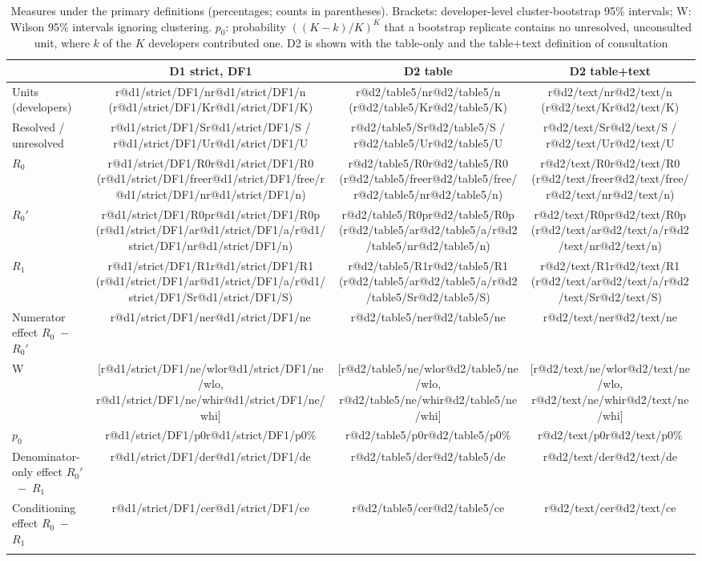 \documentclass[pdflatex,sn-basic]{sn-jnl}
\makeatletter
\newcommand{\R}[1]{\ifcsname r@#1\endcsname\csname r@#1\endcsname\else\errmessage{results.tex: unknown key #1}\fi}
\newcommand{\CI}[1]{[\R{#1/lo}, \R{#1/hi}]}
\newcommand{\WCI}[1]{[\R{#1/wlo}, \R{#1/whi}]}
\newcommand{\Rz}{\ensuremath{R_0}}
\newcommand{\Rzp}{\ensuremath{R_0'}}
\newcommand{\Ro}{\ensuremath{R_1}}
\makeatother
\begin{document}
\begin{table}[t]
\caption{Measures under the primary definitions (percentages; counts in parentheses). Brackets: developer-level cluster-bootstrap 95\% intervals; W: Wilson 95\% intervals ignoring clustering. $p_0$: probability $((K-k)/K)^K$ that a bootstrap replicate contains no unresolved, unconsulted unit, where $k$ of the $K$ developers contributed one. D2 is shown with the table-only and the table+text definition of consultation}\label{tab:main}
\footnotesize
\begin{tabular*}{\textwidth}{@{\extracolsep\fill}lccc}
\toprule
 & D1 strict, DF1 & D2 table & D2 table+text \\
\midrule
Units (developers) & \R{d1/strict/DF1/n} (\R{d1/strict/DF1/K}) & \R{d2/table5/n} (\R{d2/table5/K}) & \R{d2/text/n} (\R{d2/text/K}) \\
Resolved / unresolved & \R{d1/strict/DF1/S} / \R{d1/strict/DF1/U} & \R{d2/table5/S} / \R{d2/table5/U} & \R{d2/text/S} / \R{d2/text/U} \\
\Rz{} & \R{d1/strict/DF1/R0} (\R{d1/strict/DF1/free}/\R{d1/strict/DF1/n}) & \R{d2/table5/R0} (\R{d2/table5/free}/\R{d2/table5/n}) & \R{d2/text/R0} (\R{d2/text/free}/\R{d2/text/n}) \\
\Rzp{} & \R{d1/strict/DF1/R0p} (\R{d1/strict/DF1/a}/\R{d1/strict/DF1/n}) & \R{d2/table5/R0p} (\R{d2/table5/a}/\R{d2/table5/n}) & \R{d2/text/R0p} (\R{d2/text/a}/\R{d2/text/n}) \\
\Ro{} & \R{d1/strict/DF1/R1} (\R{d1/strict/DF1/a}/\R{d1/strict/DF1/S}) & \R{d2/table5/R1} (\R{d2/table5/a}/\R{d2/table5/S}) & \R{d2/text/R1} (\R{d2/text/a}/\R{d2/text/S}) \\
\midrule
Numerator effect \Rz{}~$-$~\Rzp{} & \R{d1/strict/DF1/ne} \CI{d1/strict/DF1/ne} & \R{d2/table5/ne} \CI{d2/table5/ne} & \R{d2/text/ne} \CI{d2/text/ne} \\
\quad W & \WCI{d1/strict/DF1/ne} & \WCI{d2/table5/ne} & \WCI{d2/text/ne} \\
\quad $p_0$ & \R{d1/strict/DF1/p0}\% & \R{d2/table5/p0}\% & \R{d2/text/p0}\% \\
Denominator-only effect \Rzp{}~$-$~\Ro{} & \R{d1/strict/DF1/de} \CI{d1/strict/DF1/de} & \R{d2/table5/de} \CI{d2/table5/de} & \R{d2/text/de} \CI{d2/text/de} \\
Conditioning effect \Rz{}~$-$~\Ro{} & \R{d1/strict/DF1/ce} \CI{d1/strict/DF1/ce} & \R{d2/table5/ce} \CI{d2/table5/ce} & \R{d2/text/ce} \CI{d2/text/ce} \\
\botrule
\end{tabular*}
\end{table}
\end{document}
